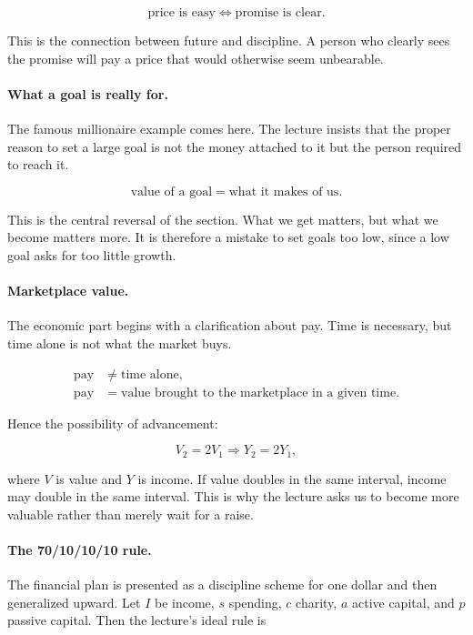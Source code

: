 \begin{equation}
\text{price is easy} \iff \text{promise is clear}.
\end{equation}

This is the connection between future and discipline. A person who clearly sees the promise will pay a price that would otherwise seem unbearable.

\paragraph{What a goal is really for.}
The famous millionaire example comes here. The lecture insists that the proper reason to set a large goal is not the money attached to it but the person required to reach it.

\begin{equation}
\text{value of a goal} = \text{what it makes of us}.
\end{equation}

This is the central reversal of the section. What we get matters, but what we become matters more. It is therefore a mistake to set goals too low, since a low goal asks for too little growth.

\paragraph{Marketplace value.}
The economic part begins with a clarification about pay. Time is necessary, but time alone is not what the market buys.

\begin{align}
\text{pay} &\neq \text{time alone}, \\
\text{pay} &= \text{value brought to the marketplace in a given time}.
\end{align}

Hence the possibility of advancement:

\begin{equation}
V_2=2V_1 \Rightarrow Y_2=2Y_1,
\end{equation}

where \(V\) is value and \(Y\) is income. If value doubles in the same interval, income may double in the same interval. This is why the lecture asks us to become more valuable rather than merely wait for a raise.

\paragraph{The 70/10/10/10 rule.}
The financial plan is presented as a discipline scheme for one dollar and then generalized upward. Let \(I\) be income, \(s\) spending, \(c\) charity, \(a\) active capital, and \(p\) passive capital. Then the lecture's ideal rule is

